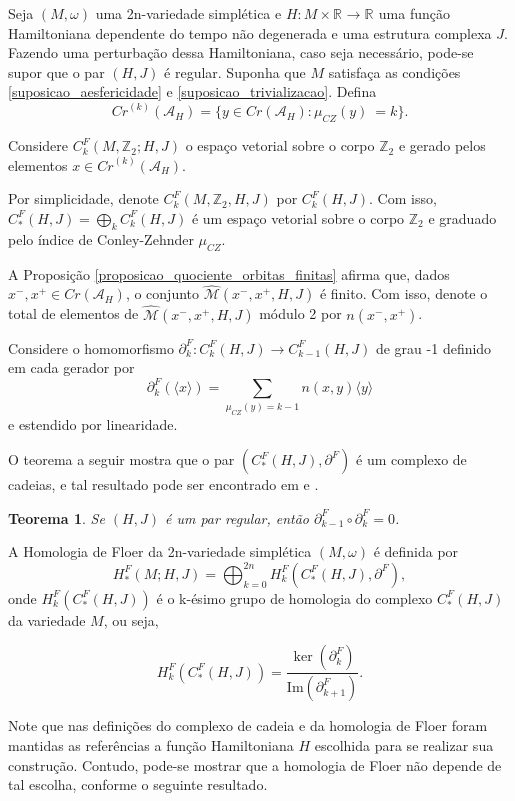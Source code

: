\documentclass[12pt]{book}
\newtheorem{teorema}{Teorema}[section]
\newcommand{\bordo}[1]{\partial_{#1}}
\newcommand{\energiafinitaM}{\mathcal{M}}
\newcommand{\funcionalH}{\mathcal{A}_{H}}
\newcommand{\gerador}[1]{\langle #1\rangle}
\newcommand{\iconley}[1]{\iconleyabrev(#1)}
\newcommand{\iconleyabrev}{\mu_{CZ}}
\newcommand{\inteiros}{\mathbb{Z}}
\newcommand{\pontoscriticos}[1]{\textit{Cr}(#1)}
\newcommand{\pontoscriticosordem}[2]{\textit{Cr}^{(#1)}(#2)}
\newcommand{\quocientetrajetorias}{\widehat{\energiafinitaM}(x^{-}, x^{+}, H, J)}
\newcommand{\real}[1]{\mathbb{R}^{#1}}
\newcommand{\reta}{\real{}}
\begin{document}
	Seja $(M,\omega)$ uma 2n-variedade simplética e $H: M\times \reta\to \reta$ uma função Hamiltoniana dependente do tempo não degenerada e uma estrutura complexa $J$. Fazendo uma perturbação dessa Hamiltoniana, caso seja necessário, pode-se supor que o par $(H,J)$ é regular. Suponha que $M$ satisfaça as condições \ref{suposicao_aesfericidade} e \ref{suposicao_trivializacao}. Defina
	$$
	\pontoscriticosordem{k}{\funcionalH} = \{ y \in \pontoscriticos{\funcionalH}: \iconley{y} \ =	 k\}.
	$$
	
	Considere $C^{F}_{k}(M, \inteiros_{2}; H,J)$ o espaço vetorial sobre o corpo $\inteiros_{2}$ e gerado pelos elementos $x \in \pontoscriticosordem{k}{\funcionalH} $.
	
	Por simplicidade, denote $C^{F}_{k}(M, \inteiros_{2}, H,J)$ por $C^{F}_{k}(H,J)$. Com isso, $C^{F}_{*}(H,J)=\bigoplus_{k}C^{F}_{k}(H,J)$ é um espaço vetorial sobre o corpo $\inteiros_{2}$ e graduado pelo índice de Conley-Zehnder $\iconleyabrev$.

	A Proposição \ref{proposicao_quociente_orbitas_finitas} afirma que, dados $x^{-},x^{+} \in \pontoscriticos{\funcionalH}$, o conjunto $\quocientetrajetorias$ é finito. Com isso, denote o total de elementos de $\quocientetrajetorias$ módulo 2 por $n(x^{-},x^{+})$.
	
	Considere o homomorfismo $\bordo{k}^{F}: C^{F}_{k}(H,J)\to C^{F}_{k-1}(H,J)$ de grau -1 definido em cada gerador por
	$$
	\bordo{k}^{F}(\gerador{x}) = \sum_{\iconley{y}=k-1}n(x,y)\gerador{y}
	$$
	e estendido por linearidade.
	
	O teorema a seguir mostra que o par $(C^{F}_{*}(H,J), \partial^{F})$ é um complexo de cadeias, e tal resultado pode ser encontrado em  \cite{audi_floer_homology} e \cite{salamon_lecture}.
	
	\begin{teorema}
		Se $(H,J)$ é um par regular, então $\partial^{F}_{k-1}\circ \partial^{F}_{k} = 0$.
	\end{teorema}
	
	A Homologia de Floer da 2n-variedade simplética $(M,\omega)$ é definida por 
	$$
		H^{F}_{*}(M;H,J)=\bigoplus_{k=0}^{2n}H^{F}_{k}(C^{F}_{*}(H,J), \partial^{F}),
	$$
	onde $H^{F}_{k}(C^{F}_{*}(H,J))$ é o k-ésimo grupo de homologia do complexo $C^{F}_{*}(H,J)$ da variedade $M$, ou seja,
			
	$$
		H^{F}_{k}(C^{F}_{*}(H,J)) = \frac{\ker(\partial^{F}_{k})}{\text{Im}(\partial^{F}_{k+1})}.
	$$ 
	
	Note que nas definições do complexo de cadeia e da homologia de Floer foram mantidas as referências a função Hamiltoniana $H$ escolhida para se realizar sua construção. Contudo,  pode-se mostrar que a homologia de Floer não depende de tal escolha, conforme o seguinte resultado.
	
\end{document}
